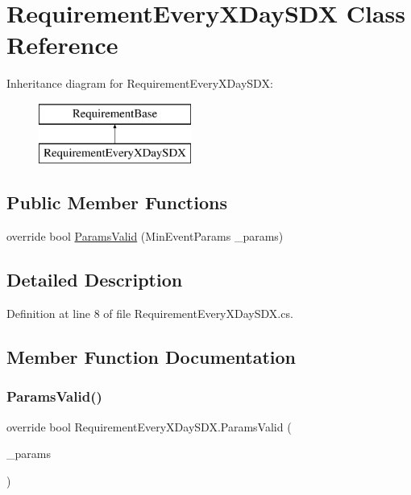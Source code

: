 \hypertarget{class_requirement_every_x_day_s_d_x}{}\section{Requirement\+Every\+X\+Day\+S\+DX Class Reference}
\label{class_requirement_every_x_day_s_d_x}
Inheritance diagram for Requirement\+Every\+X\+Day\+S\+DX\+:\begin{figure}[H]
\begin{center}
\leavevmode
\includegraphics[height=2.000000cm]{d4/d94/class_requirement_every_x_day_s_d_x}
\end{center}
\end{figure}
\subsection*{Public Member Functions}
\begin{DoxyCompactItemize}
\item 
override bool \mbox{\hyperlink{class_requirement_every_x_day_s_d_x_a6d832bc33f2b67dab829ae5718de5f65}{Params\+Valid}} (Min\+Event\+Params \+\_\+params)
\end{DoxyCompactItemize}


\subsection{Detailed Description}


Definition at line 8 of file Requirement\+Every\+X\+Day\+S\+D\+X.\+cs.



\subsection{Member Function Documentation}
\mbox{\label{class_requirement_every_x_day_s_d_x_a6d832bc33f2b67dab829ae5718de5f65}} 
\subsubsection{\texorpdfstring{ParamsValid()}{ParamsValid()}}
{\footnotesize\ttfamily override bool Requirement\+Every\+X\+Day\+S\+D\+X.\+Params\+Valid (\begin{DoxyParamCaption}\item[{Min\+Event\+Params}]{\+\_\+params }\end{DoxyParamCaption})}



